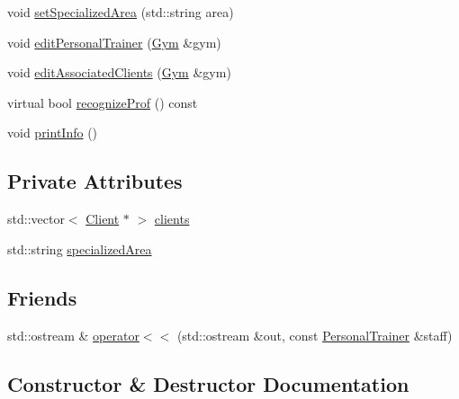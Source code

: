 \begin{DoxyCompactItemize}
\item 
void \hyperlink{classPersonalTrainer_a7f8580328de18489552e4f7a27448a49}{set\+Specialized\+Area} (std\+::string area)
\item 
void \hyperlink{classPersonalTrainer_a75733204b857d08f9c7db9acb5e812fc}{edit\+Personal\+Trainer} (\hyperlink{classGym}{Gym} \&gym)
\item 
void \hyperlink{classPersonalTrainer_ae864eec9478e62edc4bffea129786ea1}{edit\+Associated\+Clients} (\hyperlink{classGym}{Gym} \&gym)
\item 
virtual bool \hyperlink{classPersonalTrainer_a04c0c022242027e043c6ca355f145bba}{recognize\+Prof} () const 
\item 
void \hyperlink{classPersonalTrainer_a8dd995b0f78e00400fd0b859e90dea77}{print\+Info} ()
\end{DoxyCompactItemize}
\subsection*{Private Attributes}
\begin{DoxyCompactItemize}
\item 
std\+::vector$<$ \hyperlink{classClient}{Client} $\ast$ $>$ \hyperlink{classPersonalTrainer_a6317476679a0c3365fb02632f1af2aae}{clients}
\item 
std\+::string \hyperlink{classPersonalTrainer_aed2a4e21367c2cdd67aecba26924e17c}{specialized\+Area}
\end{DoxyCompactItemize}
\subsection*{Friends}
\begin{DoxyCompactItemize}
\item 
std\+::ostream \& \hyperlink{classPersonalTrainer_ad38066170f386e04ebc03724b00ee276}{operator$<$$<$} (std\+::ostream \&out, const \hyperlink{classPersonalTrainer}{Personal\+Trainer} \&staff)
\end{DoxyCompactItemize}


\subsection{Constructor \& Destructor Documentation}
